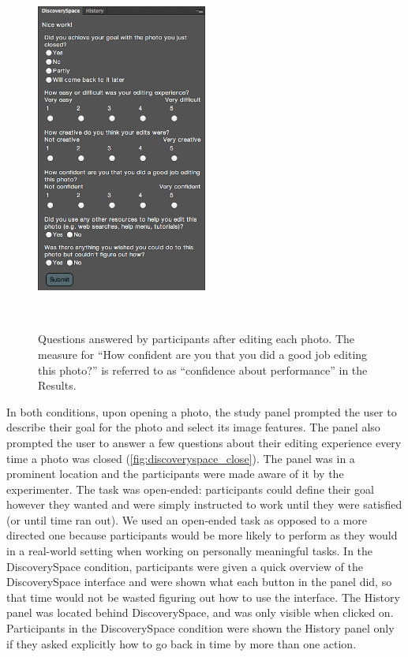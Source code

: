 \begin{figure}[b!]
\centering
  \includegraphics[width=0.5\textwidth]{discoveryspace/figures/close_questions.png}
  \caption{Questions answered by participants after editing each photo. The measure for ``How confident are you that you did a good job editing this photo?'' is referred to as ``confidence about performance'' in the Results.}~\label{fig:discoveryspace_close}
\end{figure}

In both conditions, upon opening a photo, the study panel prompted the user to describe their goal for the photo and select its image features. The panel also prompted the user to answer a few questions about their editing experience every time a photo was closed (\autoref{fig:discoveryspace_close}). The panel was in a prominent location and the participants were made aware of it by the experimenter. The task was open-ended: participants could define their goal however they wanted and were simply instructed to work until they were satisfied (or until time ran out).  We used an open-ended task as opposed to a more directed one because participants would be more likely to perform as they would in a real-world setting when working on personally meaningful tasks. In the Discovery\-Space condition, participants were given a quick overview of the Discovery\-Space interface and were shown what each button in the panel did, so that time would not be wasted figuring out how to use the interface. The History panel was located behind Discovery\-Space, and was only visible when clicked on. Participants in the Discovery\-Space condition were shown the History panel only if they asked explicitly how to go back in time by more than one action. 

